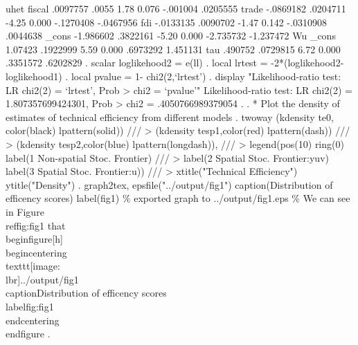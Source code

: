 uhet         {\VBAR}
      fiscal {\VBAR}   .0097757      .0055     1.78   0.076     -.001004    .0205555
       trade {\VBAR}  -.0869182   .0204711    -4.25   0.000    -.1270408   -.0467956
         fdi {\VBAR}  -.0133135   .0090702    -1.47   0.142    -.0310908    .0044638
       _cons {\VBAR}  -1.986602   .3822161    -5.20   0.000    -2.735732   -1.237472
Wu           {\VBAR}
       _cons {\VBAR}    1.07423   .1922999     5.59   0.000     .6973292    1.451131
         tau {\VBAR}    .490752   .0729815     6.72   0.000     .3351572    .6202829
{\smallskip}
. scalar loglikehood2 =  e(ll)
{\smallskip}
. local lrtest = -2*(loglikehood2-loglikehood1)
{\smallskip}
. local pvalue = 1- chi2(2,`lrtest')
{\smallskip}
. display "Likelihood-ratio test: LR chi2(2) = `lrtest', Prob > chi2 = `pvalue'"
Likelihood-ratio test: LR chi2(2) = 1.807357699424301, Prob > chi2 = .4050766989379054
{\smallskip}
. 
. * Plot the density of estimates of technical efficiency from different models
. twoway (kdensity te0, color(black) lpattern(solid)) ///
>        (kdensity tesp1,color(red) lpattern(dash))   ///
>            (kdensity tesp2,color(blue) lpattern(longdash)),  ///
>         legend(pos(10) ring(0) label(1 Non-spatial Stoc. Frontier) ///
>         label(2 Spatial Stoc. Frontier:yuv) label(3 Spatial Stoc. Frontier:u)) ///
>         xtitle("Technical Efficiency") ytitle("Density")
{\smallskip}
. graph2tex, epsfile("../output/fig1") caption(Distribution of efficency scores) label(fig1)
\% exported graph to ../output/fig1.eps
\% We can see in Figure \\ref{\lbr}fig:fig1{\rbr} that
\\begin{\lbr}figure{\rbr}[h]
\\begin{\lbr}centering{\rbr}
  \\texttt{[image: \\lbr]}../output/fig1{\rbr}
  \\caption{\lbr}Distribution of efficency scores{\rbr}
  \\label{\lbr}fig:fig1{\rbr}
\\end{\lbr}centering{\rbr}
\\end{\lbr}figure{\rbr}
{\smallskip}
. 
